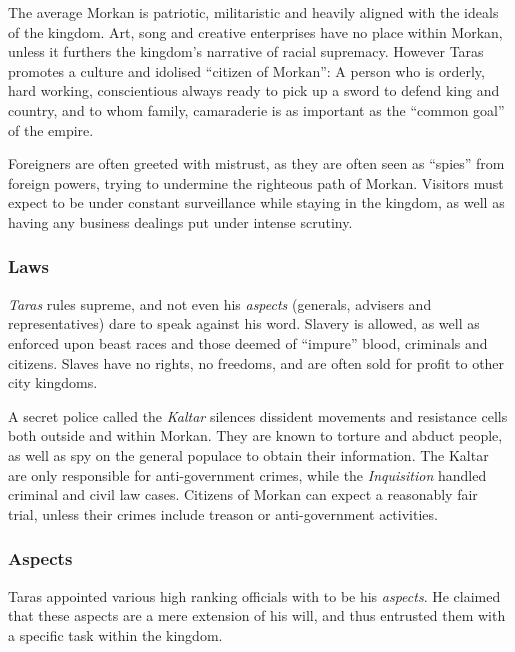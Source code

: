The average Morkan is patriotic, militaristic and heavily aligned with the
ideals of the kingdom. Art, song and creative enterprises have no place within
Morkan, unless it furthers the kingdom's narrative of racial supremacy. However
Taras promotes a culture and idolised ``citizen of Morkan'': A person who is
orderly, hard working, conscientious always ready to pick up a sword to defend
king and country, and to whom family, camaraderie is as important as the
``common goal'' of the empire.

Foreigners are often greeted with mistrust, as they are often seen as
``spies'' from foreign powers, trying to undermine the righteous path of
Morkan. Visitors must expect to be under constant surveillance while staying
in the kingdom, as well as having any business dealings put under intense
scrutiny.

\subsubsection{Laws}

\emph{Taras} rules supreme, and not even his \emph{aspects} (generals,
advisers and representatives) dare to speak against his word. Slavery is
allowed, as well as enforced upon beast races and those deemed of ``impure''
blood, criminals and citizens. Slaves have no rights, no freedoms, and are
often sold for profit to other city kingdoms.

A secret police called the \emph{Kaltar} silences dissident movements and
resistance cells both outside and within Morkan. They are known to torture and
abduct people, as well as spy on the general populace to obtain their
information. The Kaltar are only responsible for anti-government crimes, while
the \emph{Inquisition} handled criminal and civil law cases. Citizens of
Morkan can expect a reasonably fair trial, unless their crimes include treason
or anti-government activities.

\subsubsection{Aspects}


Taras appointed various high ranking officials with to be his \emph{aspects}.
He claimed that these aspects are a mere extension of his will, and thus
entrusted them with a specific task within the kingdom.

